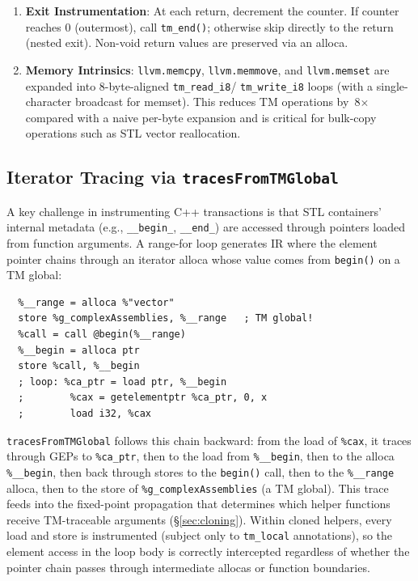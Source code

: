 \documentclass[article,12pt]{article}
\begin{document}
\begin{enumerate}
\item \textbf{Exit Instrumentation}: At each return, decrement the counter.
  If counter reaches 0 (outermost), call \texttt{tm\_end()};
  otherwise skip directly to the return (nested exit).
  Non-void return values are preserved via an alloca.

\item \textbf{Memory Intrinsics}: \texttt{llvm.memcpy}, \texttt{llvm.memmove},
  and \texttt{llvm.memset} are expanded into 8-byte-aligned \texttt{tm\_read\_i8}/
  \texttt{tm\_write\_i8} loops (with a single-character broadcast for memset).
  This reduces TM operations by~8$\times$ compared with a naive per-byte expansion
  and is critical for bulk-copy operations such as STL vector reallocation.
\end{enumerate}

\subsection{Iterator Tracing via \texttt{tracesFromTMGlobal}}

A key challenge in instrumenting C++ transactions is that STL containers'
internal metadata (e.g., \texttt{\_\_begin\_}, \texttt{\_\_end\_}) are accessed
through pointers loaded from function arguments.  A range-for loop generates IR
where the element pointer chains through an iterator alloca whose value comes
from \texttt{begin()} on a TM global:

\begin{verbatim}
  %__range = alloca %"vector"
  store %g_complexAssemblies, %__range   ; TM global!
  %call = call @begin(%__range)
  %__begin = alloca ptr
  store %call, %__begin
  ; loop: %ca_ptr = load ptr, %__begin
  ;        %cax = getelementptr %ca_ptr, 0, x
  ;        load i32, %cax
\end{verbatim}

\texttt{tracesFromTMGlobal} follows this chain backward: from the load of
\texttt{\%cax}, it traces through GEPs to \texttt{\%ca\_ptr}, then to the
load from \texttt{\%\_\_begin}, then to the alloca \texttt{\%\_\_begin},
then back through stores to the \texttt{begin()} call, then to the
\texttt{\%\_\_range} alloca, then to the store of
\texttt{\%g\_complexAssemblies} (a TM global).  This trace feeds into the
fixed-point propagation that determines which helper functions receive
TM-traceable arguments (\S\ref{sec:cloning}).  Within cloned helpers,
every load and store is instrumented (subject only to \texttt{tm\_local}
annotations), so the element access in the loop body is correctly
intercepted regardless of whether the pointer chain passes through
intermediate allocas or function boundaries.
\end{document}
